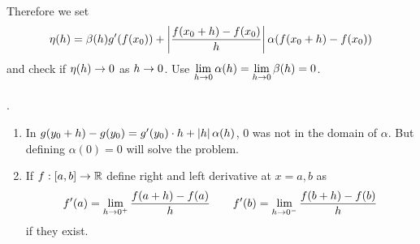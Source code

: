 Therefore we set $$\eta(h) = \beta(h) g'(f(x_0)) + \left|\frac{f(x_0+h)-f(x_0)}{h}\right| \alpha(f(x_0+h) - f(x_0)) $$
and check if $\eta(h)\rightarrow 0$ as $h\rightarrow 0$. Use $\displaystyle \lim_{h\rightarrow 0}\alpha(h) = \lim_{h\rightarrow0}\beta(h) = 0$.\\
\\
\rmk.
\begin{enumerate}
	\item In $g(y_0 + h) - g(y_0) = g'(y_0) \cdot h + \left|h\right|\alpha(h)$, 0 was not in the domain of $\alpha$. But defining $\alpha(0) = 0$ will solve the problem. 
	\item If $f:[a, b]\rightarrow \mathbb{R}$ define right and left derivative at $x=a, b$ as $$f'(a) = \lim_{h\rightarrow 0^+} \frac{f(a+h)-f(a)}{h}\qquad f'(b) = \lim_{h\rightarrow 0^-} \frac{f(b+h)-f(b)}{h}$$ if they exist.
\end{enumerate}









\pagebreak